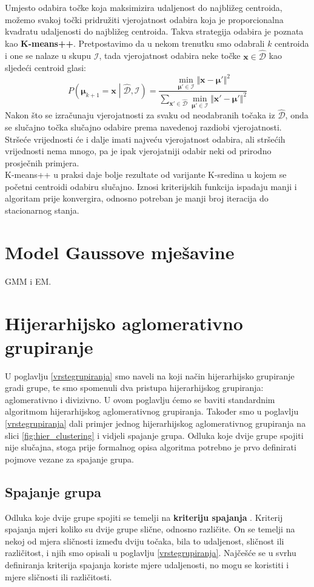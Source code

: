 \documentclass[times, utf8, zavrsni]{fer}
\begin{document}
Umjesto odabira točke koja maksimizira udaljenost do najbližeg centroida, možemo svakoj točki pridružiti vjerojatnost odabira koja je proporcionalna kvadratu udaljenosti do najbližeg centroida. Takva strategija odabira je poznata kao \textbf{K-means++}.
Pretpostavimo da u nekom trenutku smo odabrali $k$ centroida i one se nalaze u skupu $\mathcal{I}$, tada vjerojatnost odabira neke točke $\mathbf{x} \in \widehat{\mathcal{D}}$ kao sljedeći centroid glasi:
\[P \left( \boldsymbol{\mu}_{k+1} = \mathbf{x} \middle| \widehat{\mathcal{D}}, \mathcal{I}\right)
= \frac{\min_{\boldsymbol{\mu}' \in \mathcal{I}} \Vert \mathbf{x} - \boldsymbol{\mu}' \Vert^2}{\sum_{\mathbf{x}' \in \widehat{\mathcal{D}}} 
\min_{\boldsymbol{\mu}' \in \mathcal{I}} \Vert \mathbf{x}' - \boldsymbol{\mu}' \Vert^2}\]
Nakon što se izračunaju vjerojatnosti za svaku od neodabranih točaka iz $\widehat{\mathcal{D}}$, onda se slučajno točka slučajno odabire prema navedenoj razdiobi vjerojatnosti. Stršeće vrijednosti će i dalje imati najveću vjerojatnost odabira, ali stršećih vrijednosti nema mnogo, pa je ipak vjerojatniji odabir neki od prirodno prosječnih primjera.\\
K-means++ u praksi daje bolje rezultate od varijante K-sredina u kojem se početni centroidi odabiru slučajno. Iznosi kriterijskih funkcija ispadaju manji i algoritam prije konvergira, odnosno potreban je manji broj iteracija do stacionarnog stanja.

\section{Model Gaussove mješavine}
GMM i EM.

\section{Hijerarhijsko aglomerativno grupiranje}
U poglavlju \ref{vrstegrupiranja} smo naveli na koji način hijerarhijsko grupiranje gradi grupe, te smo spomenuli dva pristupa hijerarhijskog grupiranja: aglomerativno i divizivno. U ovom poglavlju ćemo se baviti standardnim algoritmom hijerarhijskog aglomerativnog grupiranja. Također smo u poglavlju \ref{vrstegrupiranja} dali primjer jednog hijerarhijskog aglomerativnog grupiranja na slici \ref{fig:hier_clustering} i vidjeli spajanje grupa. Odluka koje dvije grupe spojiti nije slučajna, stoga prije formalnog opisa algoritma potrebno je prvo definirati pojmove vezane za spajanje grupa.

\subsection{Spajanje grupa}
Odluka koje dvije grupe spojiti se temelji na \textbf{kriteriju spajanja} . Kriterij spajanja mjeri koliko su dvije grupe slične, odnosno različite. On se temelji na nekoj od mjera sličnosti između dviju točaka, bila to udaljenost, sličnost ili različitost, i njih smo opisali u poglavlju \ref{vrstegrupiranja}. Najčešće se u svrhu definiranja kriterija spajanja koriste mjere udaljenosti, no mogu se koristiti i mjere sličnosti ili različitosti.
\end{document}
